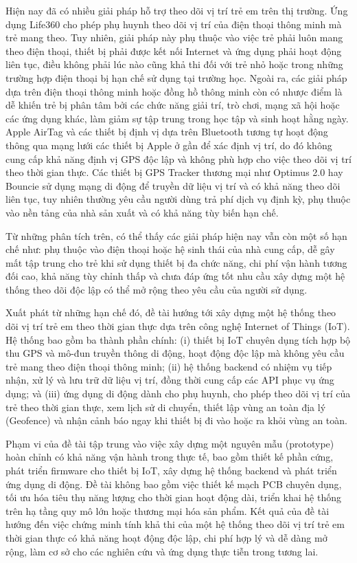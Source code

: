 \documentclass[../DoAn.tex]{subfiles}
\begin{document}
Hiện nay đã có nhiều giải pháp hỗ trợ theo dõi vị trí trẻ em trên thị trường. Ứng dụng Life360 \cite{life360} cho phép phụ huynh theo dõi vị trí của điện thoại thông minh mà trẻ mang theo. Tuy nhiên, giải pháp này phụ thuộc vào việc trẻ phải luôn mang theo điện thoại, thiết bị phải được kết nối Internet và ứng dụng phải hoạt động liên tục, điều không phải lúc nào cũng khả thi đối với trẻ nhỏ hoặc trong những trường hợp điện thoại bị hạn chế sử dụng tại trường học. Ngoài ra, các giải pháp dựa trên điện thoại thông minh hoặc đồng hồ thông minh còn có nhược điểm là dễ khiến trẻ bị phân tâm bởi các chức năng giải trí, trò chơi, mạng xã hội hoặc các ứng dụng khác, làm giảm sự tập trung trong học tập và sinh hoạt hằng ngày. Apple AirTag và các thiết bị định vị dựa trên Bluetooth tương tự hoạt động thông qua mạng lưới các thiết bị Apple ở gần để xác định vị trí, do đó không cung cấp khả năng định vị GPS độc lập và không phù hợp cho việc theo dõi vị trí theo thời gian thực. Các thiết bị GPS Tracker thương mại như Optimus 2.0 hay Bouncie sử dụng mạng di động để truyền dữ liệu vị trí và có khả năng theo dõi liên tục, tuy nhiên thường yêu cầu người dùng trả phí dịch vụ định kỳ, phụ thuộc vào nền tảng của nhà sản xuất và có khả năng tùy biến hạn chế.

Từ những phân tích trên, có thể thấy các giải pháp hiện nay vẫn còn một số hạn chế như: phụ thuộc vào điện thoại hoặc hệ sinh thái của nhà cung cấp, dễ gây mất tập trung cho trẻ khi sử dụng thiết bị đa chức năng, chi phí vận hành tương đối cao, khả năng tùy chỉnh thấp và chưa đáp ứng tốt nhu cầu xây dựng một hệ thống theo dõi độc lập có thể mở rộng theo yêu cầu của người sử dụng.

Xuất phát từ những hạn chế đó, đề tài hướng tới xây dựng một hệ thống theo dõi vị trí trẻ em theo thời gian thực dựa trên công nghệ Internet of Things (IoT). Hệ thống bao gồm ba thành phần chính: (i) thiết bị IoT chuyên dụng tích hợp bộ thu GPS và mô-đun truyền thông di động, hoạt động độc lập mà không yêu cầu trẻ mang theo điện thoại thông minh; (ii) hệ thống backend có nhiệm vụ tiếp nhận, xử lý và lưu trữ dữ liệu vị trí, đồng thời cung cấp các API phục vụ ứng dụng; và (iii) ứng dụng di động dành cho phụ huynh, cho phép theo dõi vị trí của trẻ theo thời gian thực, xem lịch sử di chuyển, thiết lập vùng an toàn địa lý (Geofence) và nhận cảnh báo ngay khi thiết bị đi vào hoặc ra khỏi vùng an toàn.

Phạm vi của đề tài tập trung vào việc xây dựng một nguyên mẫu (prototype) hoàn chỉnh có khả năng vận hành trong thực tế, bao gồm thiết kế phần cứng, phát triển firmware cho thiết bị IoT, xây dựng hệ thống backend và phát triển ứng dụng di động. Đề tài không bao gồm việc thiết kế mạch PCB chuyên dụng, tối ưu hóa tiêu thụ năng lượng cho thời gian hoạt động dài, triển khai hệ thống trên hạ tầng quy mô lớn hoặc thương mại hóa sản phẩm. Kết quả của đề tài hướng đến việc chứng minh tính khả thi của một hệ thống theo dõi vị trí trẻ em thời gian thực có khả năng hoạt động độc lập, chi phí hợp lý và dễ dàng mở rộng, làm cơ sở cho các nghiên cứu và ứng dụng thực tiễn trong tương lai.
\end{document}
